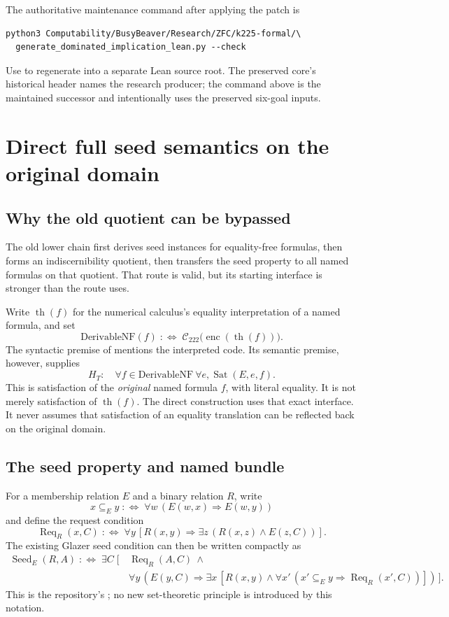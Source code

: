 \documentclass[11pt,letterpaper]{article}
\newcommand{\C}{\mathcal C_{222}}
\newcommand{\Sat}{\operatorname{Sat}}
\newcommand{\enc}{\operatorname{enc}}
\newcommand{\thh}{\operatorname{th}}
\newcommand{\Seed}{\operatorname{Seed}}
\newcommand{\Req}{\operatorname{Req}}
\newcommand{\code}[1]{\texttt{\detokenize{#1}}}
\begin{document}
The authoritative maintenance command after applying the patch is
\begin{lstlisting}
python3 Computability/BusyBeaver/Research/ZFC/k225-formal/\
  generate_dominated_implication_lean.py --check
\end{lstlisting}
Use \code{--out DIR} to regenerate into a separate Lean source root. The preserved
core's historical header names the research producer; the command above is the
maintained successor and intentionally uses the preserved six-goal inputs.

\section{Direct full seed semantics on the original domain}

\subsection{Why the old quotient can be bypassed}

The old lower chain first derives seed instances for equality-free formulas,
then forms an indiscernibility quotient, then transfers the seed property to
all named formulas on that quotient. That route is valid, but its starting
interface is stronger than the route uses.

Write $\thh(f)$ for the numerical calculus's equality interpretation of a named
formula, and set
\[
 \mathrm{DerivableNF}(f)\;:\!\Longleftrightarrow\;
 \C\bigl(\enc(\thh(f))\bigr).
\]
The syntactic premise of \code{KEind222.c222_complete} mentions the interpreted
code. Its semantic premise, however, supplies
\[
 H_T:\quad \forall f\in\mathrm{DerivableNF}\ \forall e,
                  \Sat(E,e,f).
\]
This is satisfaction of the \emph{original} named formula $f$, with literal
equality. It is not merely satisfaction of $\thh(f)$. The direct construction
uses that exact interface. It never assumes that satisfaction of an equality
translation can be reflected back on the original domain.

\subsection{The seed property and named bundle}

For a membership relation $E$ and a binary relation $R$, write
\[
 x\subseteq_E y\;:\!\Longleftrightarrow\;\forall w\,(E(w,x)\Rightarrow E(w,y))
\]
and define the request condition
\[
 \Req_R(x,C)\;:\!\Longleftrightarrow\;
 \forall y\,[R(x,y)\Rightarrow\exists z\,(R(x,z)\land E(z,C))].
\]
The existing Glazer seed condition can then be written compactly as
\begin{align*}
 \Seed_E(R,A)\;:\!\Longleftrightarrow\;\exists C\;[\,&\Req_R(A,C)\ \land\\
 &\forall y\,(E(y,C)\Rightarrow\exists x\,[R(x,y)\land
          \forall x'\,(x'\subseteq_E y\Rightarrow\Req_R(x',C))])\,].
\end{align*}
This is the repository's \code{SeedProp}; no new set-theoretic principle is
introduced by this notation.
\end{document}
